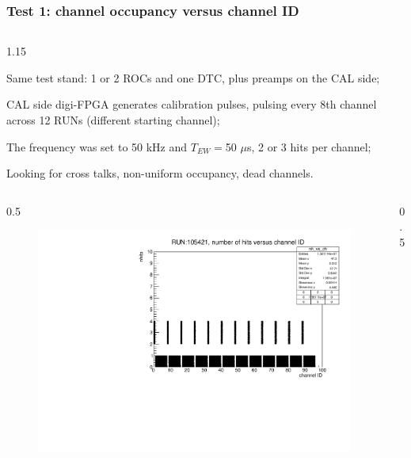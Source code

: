 \documentclass{beamer}
\begin{document}
\begin{frame}
    \frametitle{Test 1: channel occupancy versus channel ID}
\vspace{-3mm}
\begin{columns}
\begin{column}{1.15\framewidth}
    \setlength{\leftmargini}{1.1em}
 \begin{itemize}
 {\small
     \item Same test stand: 1 or 2 ROCs and one DTC, plus preamps on the CAL side;
     \item CAL side digi-FPGA generates calibration pulses, pulsing every 8th channel across 12 RUNs (different starting channel);
          \item The frequency was set to 50 kHz and  $T_{EW}=$50 $\mu$s, 2 or 3 hits per channel;
     \item Looking for cross talks, non-uniform occupancy, dead channels.
   }
 \end{itemize}
 \end{column}
  \end{columns}
    \vspace{-2mm}
   \begin{columns}
 \begin{column}{0.5\framewidth}
     \begin{figure}[!h]
      \centering
      \includegraphics[width=\columnwidth]{figures/pdf/run105421_nh_vs_ch.pdf}
     \label{fig:normalhits}
\end{figure}
 \begin{itemize}
 \end{itemize}
 \end{column}
  \begin{column}{0.5\framewidth}

\end{column}
\end{columns}
\end{frame}
\end{document}
